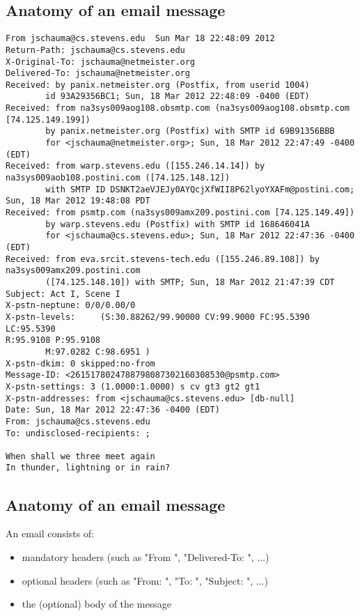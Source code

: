 \documentclass[xga]{xdvislides}
\begin{document}
\subsection{Anatomy of an email message}
\small
\begin{verbatim}
From jschauma@cs.stevens.edu  Sun Mar 18 22:48:09 2012
Return-Path: jschauma@cs.stevens.edu
X-Original-To: jschauma@netmeister.org
Delivered-To: jschauma@netmeister.org
Received: by panix.netmeister.org (Postfix, from userid 1004)
        id 93A29356BC1; Sun, 18 Mar 2012 22:48:09 -0400 (EDT)
Received: from na3sys009aog108.obsmtp.com (na3sys009aog108.obsmtp.com [74.125.149.199])
        by panix.netmeister.org (Postfix) with SMTP id 69B91356BBB
        for <jschauma@netmeister.org>; Sun, 18 Mar 2012 22:47:49 -0400 (EDT)
Received: from warp.stevens.edu ([155.246.14.14]) by na3sys009aob108.postini.com ([74.125.148.12])
        with SMTP ID DSNKT2aeVJEJy0AYQcjXfWII8P62lyoYXAFm@postini.com; Sun, 18 Mar 2012 19:48:08 PDT
Received: from psmtp.com (na3sys009amx209.postini.com [74.125.149.49])
        by warp.stevens.edu (Postfix) with SMTP id 168646041A
        for <jschauma@cs.stevens.edu>; Sun, 18 Mar 2012 22:47:36 -0400 (EDT)
Received: from eva.srcit.stevens-tech.edu ([155.246.89.108]) by na3sys009amx209.postini.com
        ([74.125.148.10]) with SMTP; Sun, 18 Mar 2012 21:47:39 CDT
Subject: Act I, Scene I
X-pstn-neptune: 0/0/0.00/0
X-pstn-levels:     (S:30.88262/99.90000 CV:99.9000 FC:95.5390 LC:95.5390
R:95.9108 P:95.9108
        M:97.0282 C:98.6951 )
X-pstn-dkim: 0 skipped:no-from
Message-ID: <2615178024788798087302160308530@psmtp.com>
X-pstn-settings: 3 (1.0000:1.0000) s cv gt3 gt2 gt1
X-pstn-addresses: from <jschauma@cs.stevens.edu> [db-null]
Date: Sun, 18 Mar 2012 22:47:36 -0400 (EDT)
From: jschauma@cs.stevens.edu
To: undisclosed-recipients: ;

When shall we three meet again
In thunder, lightning or in rain?
\end{verbatim}
\Normalsize

\subsection{Anatomy of an email message}
An email consists of:
\begin{itemize}
	\item mandatory headers (such as "From ", "Delivered-To: ", ...)
	\item optional headers (such as "From: ", "To: ", "Subject: ", ...)
	\item the (optional) body of the message
\end{itemize}
\end{document}
